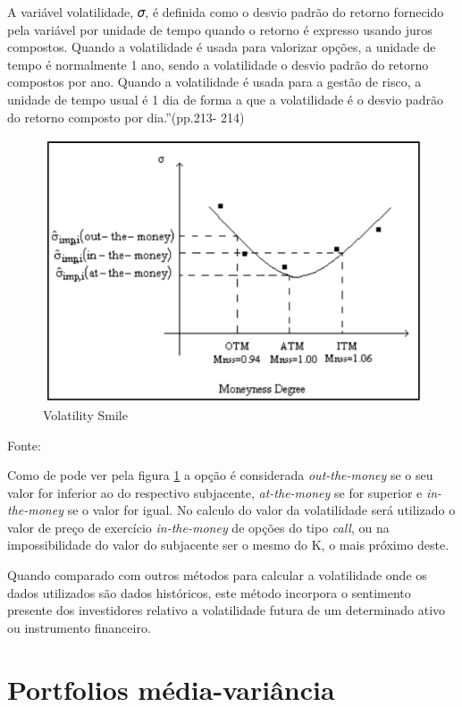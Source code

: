 \documentclass[
  12pt,
  a4paper,
  openany]{book}
\begin{document}
A variável volatilidade, 𝜎, é definida como o desvio padrão do retorno fornecido pela
variável por unidade de tempo quando o retorno é expresso usando juros compostos.
Quando a volatilidade é usada para valorizar opções, a unidade de tempo é normalmente 1 ano, sendo a volatilidade o desvio padrão do retorno compostos por ano.
Quando a volatilidade é usada para a gestão de risco, a unidade de tempo usual é 1 dia
de forma a que a volatilidade é o desvio padrão do retorno composto por dia.''(pp.213-
214)

\begin{figure}

{\centering \includegraphics[width=0.6\linewidth]{image/volatilitysmile} 

}

\caption{Volatility Smile}\label{fig:volatilitysmile}
\end{figure}
\centering

Fonte: \citep[pp.182]{volatilitysmile}

\justifying
\bigskip

Como de pode ver pela figura \ref{fig:volatilitysmile} a opção é considerada \emph{out-the-money} se o seu valor for inferior ao do respectivo subjacente, \emph{at-the-money} se for superior e \emph{in-the-money} se o valor for igual. No calculo do valor da volatilidade será utilizado o valor de preço de exercício \emph{in-the-money} de opções do tipo \emph{call}, ou na impossibilidade do valor do subjacente ser o mesmo do K, o mais próximo deste.

Quando comparado com outros métodos para calcular a volatilidade onde os dados utilizados são dados históricos, este método incorpora o sentimento presente dos investidores relativo a volatilidade futura de um determinado ativo ou instrumento financeiro.

\hypertarget{portfolios-muxe9dia-variuxe2ncia}{%
\section{Portfolios média-variância}\label{portfolios-muxe9dia-variuxe2ncia}}
\end{document}
